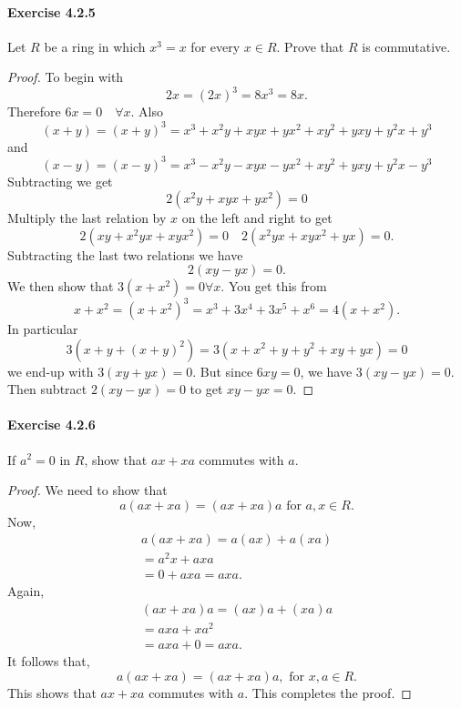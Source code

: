 \documentclass{article}
\begin{document}
\paragraph{Exercise 4.2.5} Let $R$ be a ring in which $x^3 = x$ for every $x \in R$. Prove that $R$ is commutative.
\begin{proof}
To begin with
$$
2 x=(2 x)^3=8 x^3=8 x .
$$
Therefore $6 x=0 \quad \forall x$.
Also
$$
(x+y)=(x+y)^3=x^3+x^2 y+x y x+y x^2+x y^2+y x y+y^2 x+y^3
$$
and
$$
(x-y)=(x-y)^3=x^3-x^2 y-x y x-y x^2+x y^2+y x y+y^2 x-y^3
$$
Subtracting we get
$$
2\left(x^2 y+x y x+y x^2\right)=0
$$
Multiply the last relation by $x$ on the left and right to get
$$
2\left(x y+x^2 y x+x y x^2\right)=0 \quad 2\left(x^2 y x+x y x^2+y x\right)=0 .
$$
Subtracting the last two relations we have
$$
2(x y-y x)=0 .
$$
We then show that $3\left(x+x^2\right)=0 \forall x$. You get this from
$$
x+x^2=\left(x+x^2\right)^3=x^3+3 x^4+3 x^5+x^6=4\left(x+x^2\right) .
$$
In particular
$$
3\left(x+y+(x+y)^2\right)=3\left(x+x^2+y+y^2+x y+y x\right)=0
$$
we end-up with $3(x y+y x)=0$. But since $6 x y=0$, we have $3(x y-y x)=0$. Then subtract $2(x y-y x)=0$ to get $x y-y x=0$.
\end{proof}

\paragraph{Exercise 4.2.6} If $a^2 = 0$ in $R$, show that $ax + xa$ commutes with $a$.
\begin{proof}
We need to show that
$$
a(a x+x a)=(a x+x a) a \text { for } a, x \in R .
$$
Now,
$$
\begin{gathered}
a(a x+x a)=a(a x)+a(x a) \\
=a^2 x+a x a \\
=0+a x a=a x a .
\end{gathered}
$$
Again,
$$
\begin{gathered}
(a x+x a) a=(a x) a+(x a) a \\
=a x a+x a^2 \\
=a x a+0=a x a .
\end{gathered}
$$
It follows that,
$$
a(a x+x a)=(a x+x a) a, \text { for } x, a \in R .
$$
This shows that $a x+x a$ commutes with $a$. This completes the proof.
\end{proof}
\end{document}
